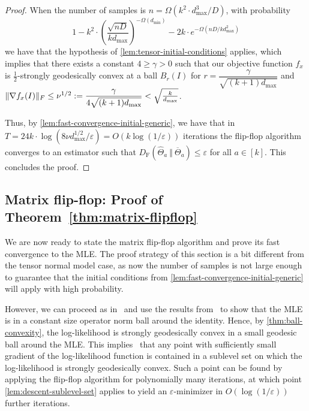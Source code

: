 \documentclass[aos]{imsart}
\theoremstyle{definition}
\numberwithin{equation}{section}
\DeclarePairedDelimiter{\norm}{\lVert}{\rVert}
\newcommand{\otheta}{\overline{\Theta}}
\newcommand{\htheta}{\widehat{\Theta}}
\newcommand{\eps}{\varepsilon}
\newcommand{\DF}{D_{\operatorname{F}}}
\def\dmin{d_{\min}}
\def\dmax{d_{\max}}
\begin{document}
\begin{proof}
	When the number of samples is $n = \Omega(k^2 \cdot \dmax^3/D)$, with probability
	$$ 1 - k^2 \cdot \left( \dfrac{\sqrt{nD}}{k \dmax} \right)^{-\Omega(\dmin)} - 2k \cdot e^{- \Omega(nD/k \dmax^2)}$$
	we have that the hypothesis of \cref{lem:tensor-initial-conditions} applies, which implies that there exists a constant $4 \geq \gamma > 0$ such that our objective function $f_x$ is $\frac{1}{2}$-strongly geodesically convex at a ball $B_r(I)$ for $r = \dfrac{\gamma}{\sqrt{(k+1)\dmax}}$ and $\norm{\nabla f_x(I)}_F \leq \nu^{1/2}:=\dfrac{\gamma}{4 \sqrt{(k+1)\dmax}} < \sqrt{\frac{k}{\dmax}}$.

Thus, by \cref{lem:fast-convergence-initial-generic}, we have that in $T = 24k \cdot \log(8 \nu \dmax^{1/2}/\eps) = O(k \log( 1/\eps))$ iterations the flip-flop algorithm converges to an estimator such that $\DF(\htheta_a \ \Vert  \ \otheta_a) \leq \eps$ for all $a \in [k]$. This concludes the proof.
\end{proof}

\subsection{Matrix flip-flop: Proof of Theorem~\ref{thm:matrix-flipflop}}

We are now ready to state the matrix flip-flop algorithm and prove its fast convergence to the MLE.
The proof strategy of this section is a bit different from the tensor normal model case, as now the number of samples is not large enough to guarantee that the initial conditions from \cref{lem:fast-convergence-initial-generic} will apply with high probability.

However, we can proceed as in~\cite{FM20} and use the results from~\cite{KLR19} to show that the MLE is in a constant size operator norm ball around the identity. Hence, by \cref{thm:ball-convexity}, the log-likelihood is strongly geodesically convex in a small geodesic ball around the MLE. This implies~\cite[Lemma 4.7]{FM20} that any point with sufficiently small gradient of the log-likelihood function is contained in a sublevel set on which the log-likelihood is strongly geodesically convex. Such a point can be found by applying the flip-flop algorithm for polynomially many iterations, at which point \cref{lem:descent-sublevel-set} applies to yield an $\varepsilon$-minimizer in $O(\log(1/\varepsilon))$ further iterations.
\end{document}
